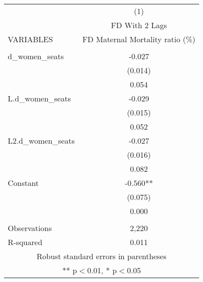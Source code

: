 \begin{tabular}{lc} \hline
 & (1) \\
 & FD With 2 Lags \\
VARIABLES & FD Maternal Mortality ratio (\%) \\ \hline
 &  \\
d\_women\_seats & -0.027 \\
 & (0.014) \\
 & 0.054 \\
L.d\_women\_seats & -0.029 \\
 & (0.015) \\
 & 0.052 \\
L2.d\_women\_seats & -0.027 \\
 & (0.016) \\
 & 0.082 \\
Constant & -0.560** \\
 & (0.075) \\
 & 0.000 \\
 &  \\
Observations & 2,220 \\
 R-squared & 0.011 \\ \hline
\multicolumn{2}{c}{ Robust standard errors in parentheses} \\
\multicolumn{2}{c}{ ** p$<$0.01, * p$<$0.05} \\
\end{tabular}
